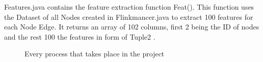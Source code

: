 Features.java contains the feature extraction function Feat(). This function uses the Dataset of all Nodes created in Flinkmancer.java to extract 100 features for each Node Edge. It returns an array of 102 columns, first 2 being the ID of nodes and the rest 100 the features in form of Tuple2 .
\begin{figure}[ht]
\noindent{}
\caption{Every process that takes place in the project}
\label{fig:graph}
\end{figure}
